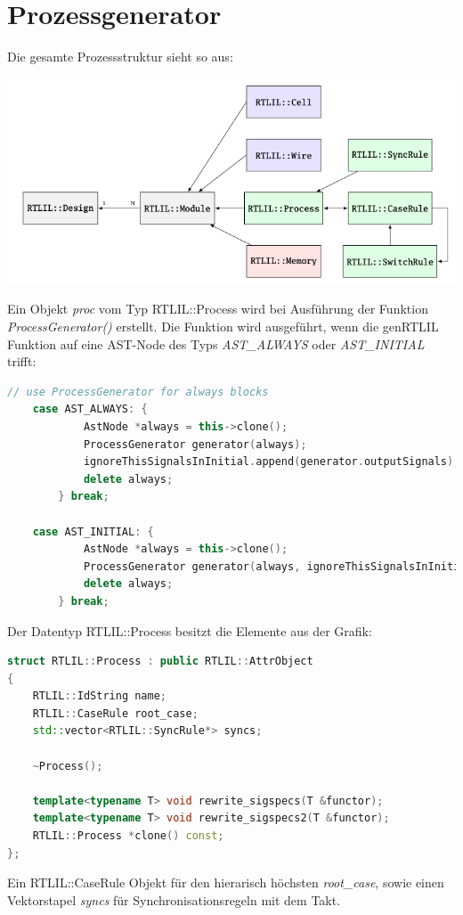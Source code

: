 \documentclass[11pt]{report}
\begin{document}
\section{Prozessgenerator}
Die gesamte Prozessstruktur sieht so aus:
\begin{center}
\includegraphics[scale=0.5]{process.png}
\end{center}
Ein Objekt \textit{proc} vom Typ RTLIL::Process wird bei Ausführung der Funktion \textit{ProcessGenerator()} erstellt.
Die Funktion wird ausgeführt, wenn die genRTLIL Funktion auf eine AST-Node des Typs \textit{AST\_ALWAYS} oder \textit{AST\_INITIAL} trifft:
\begin{lstlisting}[language=C++]
	// use ProcessGenerator for always blocks
	case AST_ALWAYS: {
			AstNode *always = this->clone();
			ProcessGenerator generator(always);
			ignoreThisSignalsInInitial.append(generator.outputSignals);
			delete always;
		} break;

	case AST_INITIAL: {
			AstNode *always = this->clone();
			ProcessGenerator generator(always, ignoreThisSignalsInInitial);
			delete always;
		} break;
\end{lstlisting}
Der Datentyp RTLIL::Process besitzt die Elemente aus der Grafik:
\begin{lstlisting}[language=C++]
struct RTLIL::Process : public RTLIL::AttrObject
{
	RTLIL::IdString name;
	RTLIL::CaseRule root_case;
	std::vector<RTLIL::SyncRule*> syncs;

	~Process();

	template<typename T> void rewrite_sigspecs(T &functor);
	template<typename T> void rewrite_sigspecs2(T &functor);
	RTLIL::Process *clone() const;
};
\end{lstlisting}
Ein RTLIL::CaseRule Objekt für den hierarisch höchsten \textit{root\_case}, sowie einen Vektorstapel \textit{syncs} für Synchronisationsregeln mit dem Takt.
\end{document}
